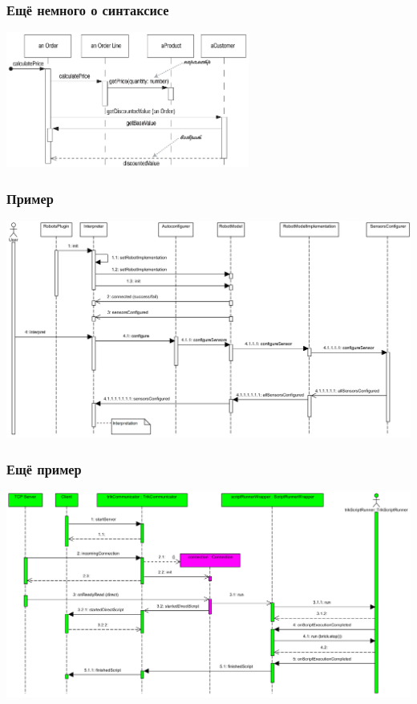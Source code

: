 \documentclass{../mcsslides}
\begin{document}
    \begin{frame}
        \frametitle{Ещё немного о синтаксисе}
        \begin{center}
            \includegraphics[width=0.6\textwidth]{sequenceDiagramSyntax2.png}
        \end{center}
    \end{frame}

    \begin{frame}
        \frametitle{Пример}
        \begin{center}
            \includegraphics[width=\textwidth]{sequenceDiagramExample.png}
        \end{center}
    \end{frame}

    \begin{frame}
        \frametitle{Ещё пример}
        \begin{center}
            \includegraphics[width=\textwidth]{sequenceDiagramExample2.png}
        \end{center}
    \end{frame}
\end{document}
